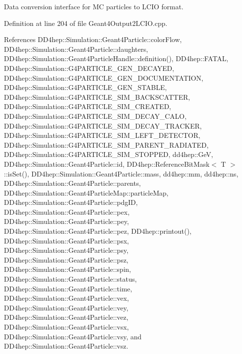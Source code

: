 Data conversion interface for MC particles to L\+C\+IO format. 



Definition at line 204 of file Geant4\+Output2\+L\+C\+I\+O.\+cpp.



References D\+D4hep\+::\+Simulation\+::\+Geant4\+Particle\+::color\+Flow, D\+D4hep\+::\+Simulation\+::\+Geant4\+Particle\+::daughters, D\+D4hep\+::\+Simulation\+::\+Geant4\+Particle\+Handle\+::definition(), D\+D4hep\+::\+F\+A\+T\+AL, D\+D4hep\+::\+Simulation\+::\+G4\+P\+A\+R\+T\+I\+C\+L\+E\+\_\+\+G\+E\+N\+\_\+\+D\+E\+C\+A\+Y\+ED, D\+D4hep\+::\+Simulation\+::\+G4\+P\+A\+R\+T\+I\+C\+L\+E\+\_\+\+G\+E\+N\+\_\+\+D\+O\+C\+U\+M\+E\+N\+T\+A\+T\+I\+ON, D\+D4hep\+::\+Simulation\+::\+G4\+P\+A\+R\+T\+I\+C\+L\+E\+\_\+\+G\+E\+N\+\_\+\+S\+T\+A\+B\+LE, D\+D4hep\+::\+Simulation\+::\+G4\+P\+A\+R\+T\+I\+C\+L\+E\+\_\+\+S\+I\+M\+\_\+\+B\+A\+C\+K\+S\+C\+A\+T\+T\+ER, D\+D4hep\+::\+Simulation\+::\+G4\+P\+A\+R\+T\+I\+C\+L\+E\+\_\+\+S\+I\+M\+\_\+\+C\+R\+E\+A\+T\+ED, D\+D4hep\+::\+Simulation\+::\+G4\+P\+A\+R\+T\+I\+C\+L\+E\+\_\+\+S\+I\+M\+\_\+\+D\+E\+C\+A\+Y\+\_\+\+C\+A\+LO, D\+D4hep\+::\+Simulation\+::\+G4\+P\+A\+R\+T\+I\+C\+L\+E\+\_\+\+S\+I\+M\+\_\+\+D\+E\+C\+A\+Y\+\_\+\+T\+R\+A\+C\+K\+ER, D\+D4hep\+::\+Simulation\+::\+G4\+P\+A\+R\+T\+I\+C\+L\+E\+\_\+\+S\+I\+M\+\_\+\+L\+E\+F\+T\+\_\+\+D\+E\+T\+E\+C\+T\+OR, D\+D4hep\+::\+Simulation\+::\+G4\+P\+A\+R\+T\+I\+C\+L\+E\+\_\+\+S\+I\+M\+\_\+\+P\+A\+R\+E\+N\+T\+\_\+\+R\+A\+D\+I\+A\+T\+ED, D\+D4hep\+::\+Simulation\+::\+G4\+P\+A\+R\+T\+I\+C\+L\+E\+\_\+\+S\+I\+M\+\_\+\+S\+T\+O\+P\+P\+ED, dd4hep\+::\+GeV, D\+D4hep\+::\+Simulation\+::\+Geant4\+Particle\+::id, D\+D4hep\+::\+Reference\+Bit\+Mask$<$ T $>$\+::is\+Set(), D\+D4hep\+::\+Simulation\+::\+Geant4\+Particle\+::mass, dd4hep\+::mm, dd4hep\+::ns, D\+D4hep\+::\+Simulation\+::\+Geant4\+Particle\+::parents, D\+D4hep\+::\+Simulation\+::\+Geant4\+Particle\+Map\+::particle\+Map, D\+D4hep\+::\+Simulation\+::\+Geant4\+Particle\+::pdg\+ID, D\+D4hep\+::\+Simulation\+::\+Geant4\+Particle\+::pex, D\+D4hep\+::\+Simulation\+::\+Geant4\+Particle\+::pey, D\+D4hep\+::\+Simulation\+::\+Geant4\+Particle\+::pez, D\+D4hep\+::printout(), D\+D4hep\+::\+Simulation\+::\+Geant4\+Particle\+::psx, D\+D4hep\+::\+Simulation\+::\+Geant4\+Particle\+::psy, D\+D4hep\+::\+Simulation\+::\+Geant4\+Particle\+::psz, D\+D4hep\+::\+Simulation\+::\+Geant4\+Particle\+::spin, D\+D4hep\+::\+Simulation\+::\+Geant4\+Particle\+::status, D\+D4hep\+::\+Simulation\+::\+Geant4\+Particle\+::time, D\+D4hep\+::\+Simulation\+::\+Geant4\+Particle\+::vex, D\+D4hep\+::\+Simulation\+::\+Geant4\+Particle\+::vey, D\+D4hep\+::\+Simulation\+::\+Geant4\+Particle\+::vez, D\+D4hep\+::\+Simulation\+::\+Geant4\+Particle\+::vsx, D\+D4hep\+::\+Simulation\+::\+Geant4\+Particle\+::vsy, and D\+D4hep\+::\+Simulation\+::\+Geant4\+Particle\+::vsz.

